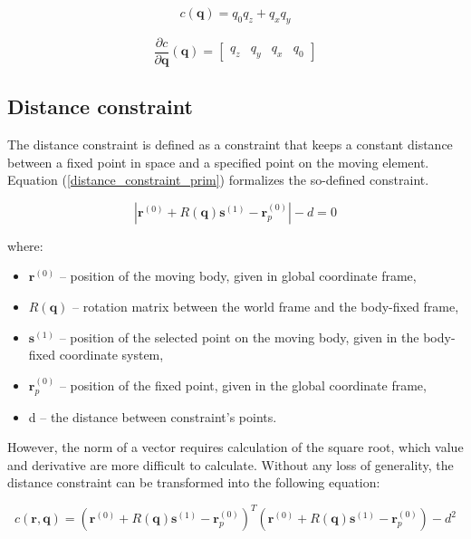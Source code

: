 \begin{equation}
	c \left( \bm{q} \right) = q_{0}q_{z}+q_{x}q_{y}
	\label{yaw_constraint_fun}
\end{equation}

\begin{equation}
	\frac{\partial c}{\partial \bm{q}}  \left( \bm{q} \right) =
	\begin{bmatrix}
	 q_{z} &  q_{y} &  q_{x} &  q_{0}
	\end{bmatrix}
	\label{yaw_constraint_fun_der}
\end{equation}

\subsection{Distance constraint}

The distance constraint is defined as a constraint that keeps a constant distance between a fixed point in space and a specified point on the moving element. Equation (\ref{distance_constraint_prim}) formalizes the so-defined constraint.

\begin{equation}
	\left| \bm{r}^{(0)} + R(\bm{q})\bm{s}^{(1)} - \bm{r}_p^{(0)} \right| - d = 0
	\label{distance_constraint_prim}
\end{equation}

where:
\begin{itemize}[noitemsep]
	\item $\bm{r}^{(0)}$ -- position of the moving body, given in global coordinate frame,
	\item $R(\bm{q})$ -- rotation matrix between the world frame and the body-fixed frame,
	\item $\bm{s}^{(1)}$ -- position of the selected point on the moving body, given in the body-fixed coordinate system,
	\item $\bm{r}_p^{(0)}$ -- position of the fixed point, given in the global coordinate frame,
	\item d -- the distance between constraint's points.
\end{itemize}

However, the norm of a vector requires calculation of the square root, which value and derivative are more difficult to calculate. Without any loss of generality, the distance constraint can be transformed into the following equation:

\begin{equation}
	c(\bm{r}, \bm{q}) = \left( \bm{r}^{(0)} + R(\bm{q})\bm{s}^{(1)} - \bm{r}_p^{(0)} \right)^T \left( \bm{r}^{(0)} + R(\bm{q})\bm{s}^{(1)} - \bm{r}_p^{(0)} \right) - d^2
	\label{distance_constraint_fun}
\end{equation}

